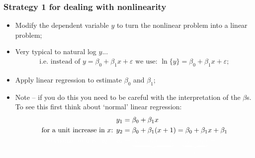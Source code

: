 \documentclass[aspectratio=169]{beamer}
\theoremstyle{principle}
\begin{document}
\begin{frame}
\frametitle{Strategy 1 for dealing with nonlinearity}

\begin{itemize}
\item Modify the dependent variable $y$ to turn the nonlinear problem into a linear problem;
\item Very typical to natural log $y$...
\begin{align*}
\mbox{i.e. instead of }y = \beta_0 + \beta_1x + \varepsilon\mbox{ we use: }\ln\{y\} = \beta_0 + \beta_1x + \varepsilon;
\end{align*}
\item Apply linear regression to estimate $\beta_0$ and $\beta_1$;
\item Note -- if you do this you need to be careful with the interpretation of the $\beta$s.  To see this first think about `normal' linear regression:
\begin{align*}
y_1 &= \beta_0 + \beta_1x\\
\mbox{for a unit increase in $x$: } y_2 &= \beta_0 + \beta_1(x + 1) = \beta_0 + \beta_1x + \beta_1\\
\color{white}\mbox{so change in $y$ is: }y_2 - y_1 &\color{white}= \underbrace{\beta_0 + \beta_1x + \beta_1}_{y_2} - \underbrace{\beta_0 - \beta_1x}_{y_1} = \beta_1.
\end{align*}

\end{itemize}

\end{frame}
\end{document}

